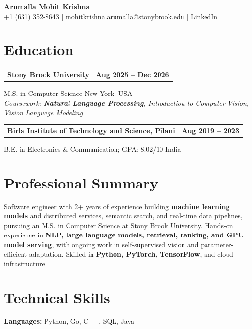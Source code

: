 \documentclass[letterpaper,10pt]{article}
\makeatletter
\newcommand{\entry}[2]{%
  \noindent
  \begin{tabularx}{\linewidth}
    {@{}>{\raggedright\arraybackslash}X@{\hspace{6pt}}r@{}}
    \textbf{#1} & #2
  \end{tabularx}\par
}
\makeatother
\begin{document}
\begin{center}
    {\LARGE\bfseries Arumalla Mohit Krishna}\\[3pt]
    +1 (631) 352-8643 $|$
    \href{mailto:mohitkrishna.arumalla@stonybrook.edu}
    {mohitkrishna.arumalla@stonybrook.edu} $|$
    \href{https://linkedin.com/in/mohit-krishna-arumalla}
    {LinkedIn}
\end{center}
\vspace{-8pt}

\section{Education}

\entry
  {\textbf{Stony Brook University}}
  {\textbf{Aug 2025 -- Dec 2026}}

M.S. in Computer Science \hfill New York, USA\\
\textit{
Coursework: \textbf{Natural Language Processing},
Introduction to Computer Vision, Vision Language Modeling
}
\vspace{3pt}

\entry
  {\textbf{Birla Institute of Technology and Science, Pilani}}
  {\textbf{Aug 2019 -- 2023}}

B.E. in Electronics \& Communication; GPA: 8.02/10 \hfill India
\section{Professional Summary}

Software engineer with 2+ years of experience building \textbf{machine learning models} and distributed services,
semantic search, and real-time data pipelines, pursuing an M.S. in Computer
Science at Stony Brook University. Hands-on experience in \textbf{NLP, large language models, retrieval, ranking, and GPU model serving}, with ongoing work
in self-supervised vision and parameter-efficient adaptation. Skilled in
\textbf{Python, PyTorch, TensorFlow}, and cloud infrastructure.

\section{Technical Skills}

\textbf{Languages:}
Python, Go, C++, SQL, Java\\
\end{document}
